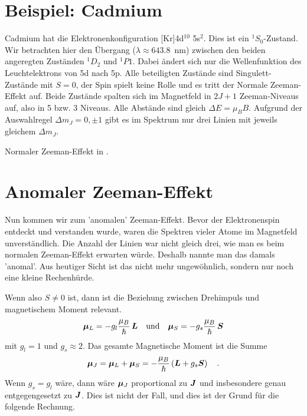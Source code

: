 \section{Beispiel: Cadmium}

Cadmium hat die Elektronenkonfiguration [Kr]4d$^{10}$ 5s$^2$. Dies ist ein $^1S_0$-Zustand. Wir betrachten hier den Übergang ($\lambda \approx 643.8$~nm) zwischen den beiden angeregten Zuständen $^1D_2$ und $^1P1$. Dabei ändert sich nur die Wellenfunktion des Leuchtelektrons von 5d nach 5p. Alle beteiligten Zustände sind Singulett-Zustände mit $S=0$, der Spin spielt keine Rolle und es tritt der Normale Zeeman-Effekt auf. Beide Zustände spalten sich im Magnetfeld in $2J+1$ Zeeman-Niveaus auf, also in 5 bzw. 3 Niveaus. Alle Abstände sind gleich $\Delta E = \mu_B B$. Aufgrund der Auswahlregel $\Delta m_J = 0, \pm1$ gibt es im Spektrum nur drei Linien mit jeweils gleichem $\Delta m_J$.

\begin{marginfigure} 
    \caption{Normaler Zeeman-Effekt in .}
\end{marginfigure}


\section{Anomaler Zeeman-Effekt}

Nun kommen wir zum 'anomalen' Zeeman-Effekt. Bevor der Elektronenspin entdeckt und verstanden wurde, waren die Spektren vieler Atome im Magnetfeld unverständlich. Die Anzahl der Linien war nicht gleich drei, wie man es beim normalen Zeeman-Effekt erwarten würde. Deshalb nannte man das damals 'anomal'. Aus heutiger Sicht ist das nicht mehr ungewöhnlich, sondern nur noch eine kleine Rechenhürde.

Wenn also $S \neq 0$ ist, dann ist die Beziehung zwischen Drehimpuls und magnetischem Moment relevant.
\begin{equation}
    \boldsymbol{\mu}_L = - g_l \frac{\mu_B}{\hbar} \, \boldsymbol{L} \quad \text{und} \quad  \boldsymbol{\mu}_S = - g_s \frac{\mu_B}{\hbar} \, \boldsymbol{S}
\end{equation}
mit $g_l = 1$ und $g_s \approx 2$. Das gesamte Magnetische Moment ist die Summe
\begin{equation}
    \boldsymbol{\mu}_J =  \boldsymbol{\mu}_L +  \boldsymbol{\mu}_S = - \frac{\mu_B}{\hbar} \left( \boldsymbol{L} + g_s \boldsymbol{S} \right)  \quad .
\end{equation}
Wenn $g_s = g_l$ wäre, dann wäre $\boldsymbol{\mu}_J$ proportional zu $\boldsymbol{J}$ und insbesondere genau entgegengesetzt zu $\boldsymbol{J}$. Dies ist nicht der Fall, und dies ist der Grund für die folgende Rechnung.

